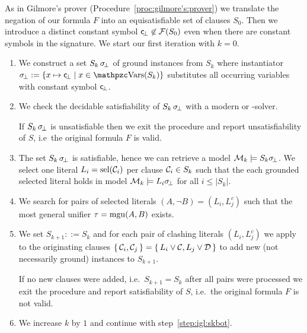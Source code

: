 \begin{procedure}\label{proc:inst:gen:loop}
	As in Gilmore's prover (Procedure~\ref{proc:gilmore's:prover})
	we translate the negation of our formula \( F \) into an equisatisfiable set of clauses
	\( S_0 \). Then we introduce a distinct constant symbol
	\( \mathsf{c} \!_\bot\not\in\mathcal{F}(S_0) \) even when there are constant symbols in the signature.
	We start our first iteration with \( k=0 \).

	\begin{enumerate}
		\item\label{step:igl:skbot}
		We construct a set \( S_{k} \, \sigma \!_\bot \) of ground instances from \( S_k \)
		where instantiator \( \subsbot := \{ x\mapsto \consbot \mid x\in\var(S_k) \} \)
		substitutes all occurring variables with constant symbol \( \mathsf{c} \!_\bot \).
%
		\item\label{step:igl:sksat} We check the decidable satisfiability of
		\( S_k \, \sigma \!_\bot \)
		with a modern \SAT{} or \SMT{}-solver.

		If \( S_k \, \sigma \!_\bot \) is unsatisfiable then we exit the procedure and report
		{ unsatisfiability} of \( S \), i.e~the original formula \( F \) is valid.

		\item\label{step:igl:model} The set \( S_k \, \sigma \!_\bot \) is satisfiable, hence we can retrieve a model \( \mathcal{M}_k \models S_k\sigma \!_\bot \).
		We select one literal \( L_i = \operatorname{sel}(\mathcal{C}_i) \) per clause \( \mathcal{C}_i \in S_k \)
		such that the each grounded selected literal holds in model
		\( \mathcal{M}_k\models L_i\sigma \!_\bot \) for all \( i \leq | S_k | \).

		\item\label{step:igl:clashes} We search for pairs of selected literals
		\( (A, \lnot B) = (L_i, L_j^c) \)
		such that the most general unifier \( \tau = \operatorname{mgu}(A,B) \) exists.

		\item We set \( S_{k+1} ::= S_k \) and for each pair of clashing literals
		\( (L_i, L^c_j) \)
		we apply \InstGen{} to the originating clauses
		\( \{ \, \mathcal{C}_{i}, \mathcal{C}_{j} \, \} = \{ \, L_i\lor\mathcal{C}, L_j\lor\mathcal{D} \, \} \)
		to add new (not necessarily ground) instances to \( S_{k+1} \).

		If no new clauses were added, i.e.~\( S_{k+1} = S_k \) after all pairs were processed we exit the procedure and report { satisfiability} of \( S \), i.e.~the original formula \( F \) is not valid.

		\item We increase \( k \) by \( 1 \) and continue with step~\ref{step:igl:skbot}.

	\end{enumerate}
\end{procedure}

